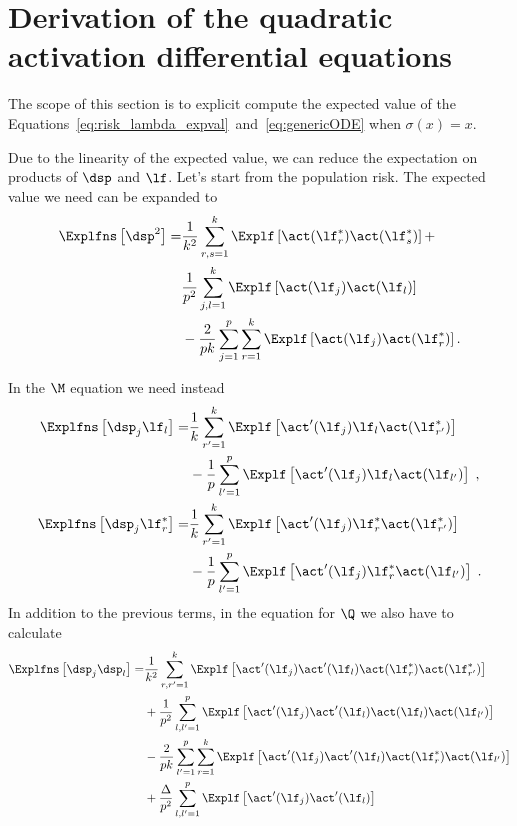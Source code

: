 \chapter[Derivation of the quadratic activation ODEs]{Derivation of the quadratic activation differential equations}
\label{app:derivation-quadratic-ode}

The scope of this section is to explicit compute the expected value of the
Equations~\eqref{eq:risk_lambda_expval}~and~\eqref{eq:genericODE} when \(\sigma(x) = x\).

Due to the linearity of the expected value, we can reduce the expectation on products of \(\dsp\) and \(\lf\).
Let's start from the population risk. The expected value we need can be expanded to 
\[\begin{split}
  \Explfns \left[  \dsp^2  \right]  =&
    \frac{1}{k^2} \sum_{r, s =1}^k \Explf\left[ \act(\lf_{r}^*) \act(\lf_{s}^*)  \right] +
  \\
  & \frac{1}{p^2} \sum_{j, l =1}^k \Explf\left[ \act(\lf_{j}) \act(\lf_{l}) \right]
  \\
  & - \frac{2}{pk}  \sum_{j=1}^p \sum_{r=1}^k \Explf\left[ \act(\lf_{j}) \act(\lf_{r}^*) \right].
\end{split}\]

In the \(\M\) equation we need instead
\[\begin{split}
  \Explfns \left[  \dsp_{j} \lf_{l}  \right]  =&  
  \frac{1}{k} \sum_{r' =1}^{k} \Explf  \left[\act' (\lf_{j}) \lf_l \act( \lf_{r'}^{*}  )  \right]
   \\
   &  -  \frac{1}{p} \sum_{l' = 1}^{p} \Explf \left[ \act' (\lf_{j}) \lf_l   \act ( \lf_{l'}  ) \right] \;, 
  \\
   \Explfns   \left[  \dsp_{j} \lf_{r}^*  \right]  =&    \frac{1}{k} \sum_{r'=1}^{k}   \Explf   \left[\act' (\lf_{j}) \lf_{r}^* \act( \lf_{r'}^{*}  )  \right]
   \\
   &   -   \frac{1}{p} \sum_{l' = 1}^{p} \Explf \left[ \act' (\lf_{j}) \lf_{r}^*   \act ( \lf_{l'}  ) \right]  \;.
\end{split}\]
In addition to the previous terms, in the equation for \(\Q\) we also have to calculate
\[\begin{split}
  \Explfns \left[  \dsp_{j} \dsp_{l}  \right]  =&  
  \frac{1}{k^2} \sum_{ r ,  r' =1}^{k} \Explf  \left[\act' (\lf_{j}) 
  \act' (\lf_{l}) \act (\lf_{r}^*  ) \act ( \lf_{r'}^{*}  )  \right]  \\
  & + \frac{1}{p^2} \sum_{ l ,  l' =1}^{p} \Explf  \left[\act' (\lf_{j}) 
  \act' (\lf_{l}) \act (\lf_{l}  ) \act ( \lf_{l'}  )  \right]  \\ 
  & - \frac{2}{pk} \sum_{ l' =1}^{p} \sum_{ r =1}^{k} \Explf  \left[\act' (\lf_{j}) 
  \act' (\lf_{l}) \act (\lf_{r}^*  ) \act ( \lf_{l'}  )  \right]  \\
  & + \frac{\Delta}{p^2} \sum_{ l ,  l' =1}^{p} \Explf  \left[\act' (\lf_{j}) 
  \act' (\lf_{l})  \right]
\end{split}\]

